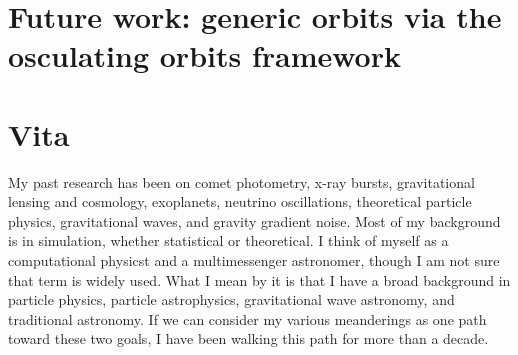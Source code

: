\documentclass[12pt,letterpaper]{lsuetd}
\begin{document}
\chapter{Future work: generic orbits via the osculating orbits framework}
\doublespacing

\pagebreak
\singlespacing
\begin{thebibliography}{999}
\vspace{0.9em}

\end{thebibliography}
%
%

\chapter*{Vita}
\doublespacing
\setlength{\parindent}{1.75em}
\vspace{0.2em}
My past research has been on comet photometry, x-ray bursts, gravitational lensing and cosmology, exoplanets, neutrino oscillations, theoretical particle physics, gravitational waves, and gravity gradient noise. Most of my background is in simulation, whether statistical or theoretical. I think of myself as a computational physicst and a multimessenger astronomer, though I am not sure that term is widely used. What I mean by it is that I have a broad background in particle physics, particle astrophysics, gravitational wave astronomy, and traditional astronomy. If we can consider my various meanderings as one path toward these two goals, I have been walking this path for more than a decade.
\end{document}
